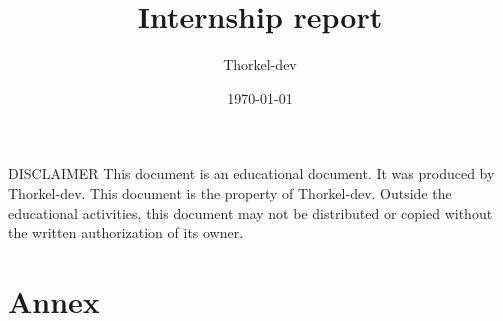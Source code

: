 \documentclass[a4paper,11pt,titlepage]{article}
\author{Thorkel-dev}        %
\title{Internship report}   %
\date{\normalsize\today}    %
\begin{document}
\maketitle

\vspace*{\fill}
\noindent
DISCLAIMER \newline
This document is an educational document. It was produced by Thorkel-dev.
This document is the property of Thorkel-dev. Outside the educational activities, this document
may not be distributed or copied without the written authorization of its owner.
\vspace*{\fill}
\clearpage


\tableofcontents \label{TableOfVersion} %

\clearpage


\clearpage



\part{Annex}
\printglossary[type=\acronymtype] \label{acronyms}
\glsaddallunused %

\clearpage
\printglossary[] \label{domaindictionary} %
\glsaddallunused %

\clearpage
\listoffigures \label{TableOfFigure} %

\clearpage
\listoflistings \label{TableOfCode} %

\clearpage
\printbibliography[heading=bibnumbered] \label{bibliography} %
\nocite{*} %

\clearpage
\null
\thispagestyle{empty}%
\addtocounter{page}{-1}%
\end{document}
